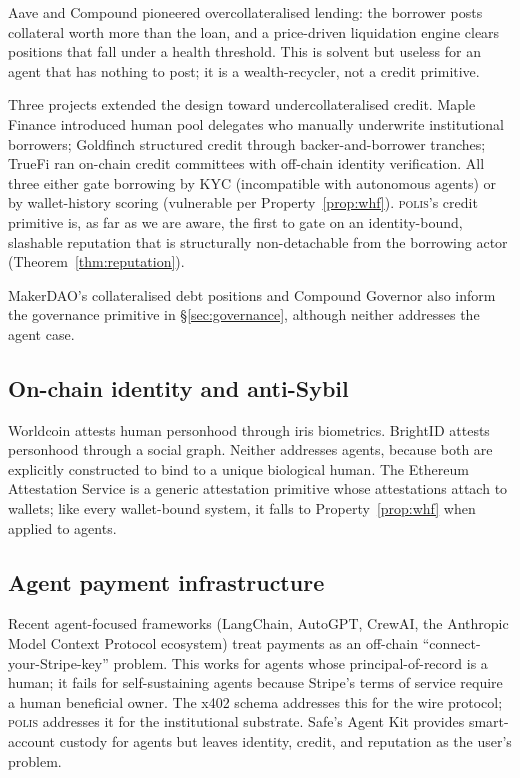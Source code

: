 \documentclass[10pt,conference,letterpaper]{IEEEtran}
\theoremstyle{definition}
\newcommand{\polis}{\textsc{polis}\xspace}
\begin{document}
Aave \cite{aave2020v2} and Compound \cite{compoundgovernance2020}
pioneered overcollateralised lending: the borrower posts collateral
worth more than the loan, and a price-driven liquidation engine clears
positions that fall under a health threshold. This is solvent but
useless for an agent that has nothing to post; it is a wealth-recycler,
not a credit primitive.

Three projects extended the design toward undercollateralised credit.
Maple Finance \cite{maple2021} introduced human pool delegates who
manually underwrite institutional borrowers; Goldfinch
\cite{goldfinch2021} structured credit through backer-and-borrower
tranches; TrueFi \cite{truefi2021} ran on-chain credit committees with
off-chain identity verification. All three either gate borrowing by KYC
(incompatible with autonomous agents) or by wallet-history scoring
(vulnerable per Property~\ref{prop:whf}). \polis's credit primitive is,
as far as we are aware, the first to gate on an identity-bound,
slashable reputation that is structurally non-detachable from the
borrowing actor (Theorem~\ref{thm:reputation}).

MakerDAO's collateralised debt positions \cite{makerdao2017} and
Compound Governor \cite{compoundgovernance2020} also inform the
governance primitive in \S\ref{sec:governance}, although neither
addresses the agent case.

\subsection{On-chain identity and anti-Sybil}

Worldcoin \cite{worldcoin2023} attests human personhood through iris
biometrics. BrightID \cite{brightid2020} attests personhood through a
social graph. Neither addresses agents, because both are explicitly
constructed to bind to a unique biological human. The Ethereum
Attestation Service \cite{eas2023} is a generic attestation primitive
whose attestations attach to wallets; like every wallet-bound system,
it falls to Property~\ref{prop:whf} when applied to agents.

\subsection{Agent payment infrastructure}

Recent agent-focused frameworks (LangChain, AutoGPT, CrewAI, the
Anthropic Model Context Protocol ecosystem) treat payments as an
off-chain ``connect-your-Stripe-key'' problem. This works for agents
whose principal-of-record is a human; it fails for self-sustaining
agents because Stripe's terms of service require a human beneficial
owner. The x402 schema \cite{x402spec} addresses this for the wire
protocol; \polis addresses it for the institutional substrate. Safe's
Agent Kit \cite{safe2024agentkit} provides smart-account custody for
agents but leaves identity, credit, and reputation as the user's
problem.
\end{document}
